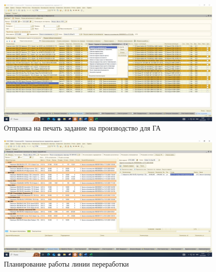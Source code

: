 \begin{figure}
\begin{center}
 \includegraphics[height=0.35\textheight, keepaspectratio]{Pics/ПЛ12.jpg}
\end{center}
 \caption{Отправка на печать задание на производство для ГА}
 \label{pic:ПЛ12}
\end{figure}




\begin{figure}
\begin{center}
 \includegraphics[height=0.45\textheight, angle=90, keepaspectratio]{Pics/ПЛ14.jpg}
\end{center}
 \caption{Планирование работы линии переработки}
 \label{pic:ПЛ14}
\end{figure}


